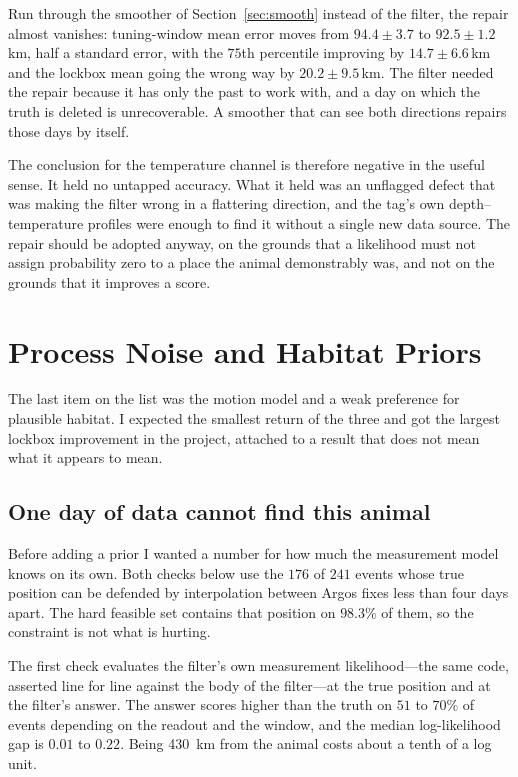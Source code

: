 \documentclass[conference]{IEEEtran}
\begin{document}
Run through the smoother of Section~\ref{sec:smooth} instead of the filter, the
repair almost vanishes: tuning-window mean error moves from $94.4\pm3.7$ to
$92.5\pm1.2$\,\si{\km}, half a standard error, with the $75$th percentile
improving by $14.7\pm6.6$\,\si{\km} and the lockbox mean going the wrong way by
$20.2\pm9.5$\,\si{\km}. The filter needed the repair because it has only the past
to work with, and a day on which the truth is deleted is unrecoverable. A
smoother that can see both directions repairs those days by itself.

The conclusion for the temperature channel is therefore negative in the useful
sense. It held no untapped accuracy. What it held was an unflagged defect that
was making the filter wrong in a flattering direction, and the tag's own
depth--temperature profiles were enough to find it without a single new data
source. The repair should be adopted anyway, on the grounds that a likelihood
must not assign probability zero to a place the animal demonstrably was, and not
on the grounds that it improves a score.

\section{Process Noise and Habitat Priors}
\label{sec:prior}

The last item on the list was the motion model and a weak preference for
plausible habitat. I expected the smallest return of the three and got the
largest lockbox improvement in the project, attached to a result that does not
mean what it appears to mean.

\subsection{One day of data cannot find this animal}

Before adding a prior I wanted a number for how much the measurement model
knows on its own. Both checks below use the $176$ of $241$ events whose true
position can be defended by interpolation between Argos fixes less than four
days apart. The hard feasible set contains that position on $98.3\%$ of them,
so the constraint is not what is hurting.

The first check evaluates the filter's own measurement likelihood---the same
code, asserted line for line against the body of the filter---at the true
position and at the filter's answer. The answer scores higher than the truth on
$51$ to $70\%$ of events depending on the readout and the window, and the
median log-likelihood gap is $0.01$ to $0.22$. Being \SI{430}{\km} from the
animal costs about a tenth of a log unit.
\end{document}
